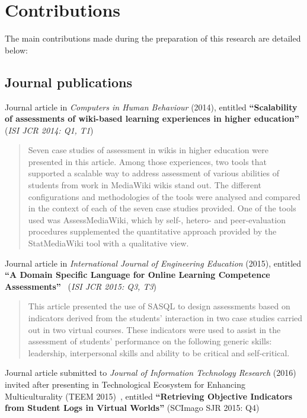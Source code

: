 \section{Contributions} \label{eva:contribucionesEN}

	The main contributions made during the preparation of this research are detailed below:

	\subsection*{Journal publications}


Journal article in \emph{Computers in Human Behaviour} (2014), entitled \textbf{``Scalability of assessments of wiki-based learning experiences in higher education''}~\cite{palomo2014scalability} (\emph{ISI JCR 2014: Q1, T1})

\begin{quote}Seven case studies of assessment in wikis in higher education were presented in this article. Among those experiences, two tools that supported a scalable way to address assessment of various abilities of students from work in MediaWiki wikis stand out. The different configurations and methodologies of the tools were analysed and compared in the context of each of the seven case studies provided. One of the tools used was AssessMediaWiki, which by self-, hetero- and peer-evaluation procedures supplemented the quantitative approach provided by the StatMediaWiki tool with a qualitative view.\end{quote}

\noindent
Journal article in \emph{International Journal of Engineering Education} (2015), entitled \textbf{``A Domain Specific Language for Online Learning Competence Assessments''}~\cite{Balderas:2015} (\emph{ISI JCR 2015: Q3, T3})

\begin{quote}This article presented the use of SASQL to design assessments based on indicators derived from the students’ interaction in two case studies carried out in two virtual courses. These indicators were used to assist in the assessment of students’ performance on the following generic skills: leadership, interpersonal skills and ability to be critical and self-critical.\end{quote}

\noindent
Journal article submitted to \emph{Journal of Information Technology Research} (2016) invited after presenting in Technological Ecosystem for Enhancing Multiculturality (TEEM 2015)~\cite{balderas2015domain}, entitled \textbf{``Retrieving Objective Indicators from Student Logs in Virtual Worlds''} (SCImago SJR 2015: Q4)

